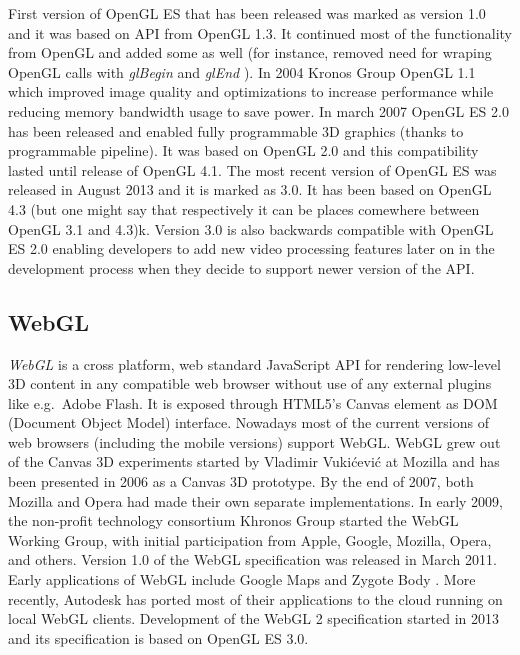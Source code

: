 First version of OpenGL ES that has been released was marked as version 1.0 and it was based on API from OpenGL 1.3.
It continued most of the functionality from OpenGL and added some as well (for instance, removed need for wraping OpenGL calls with \emph{glBegin} and \emph{glEnd} ).
\newline In 2004 Kronos Group OpenGL 1.1 which improved image quality and optimizations to increase performance while reducing memory bandwidth usage to save power.
\newline In march 2007 OpenGL ES 2.0 has been released and enabled fully programmable 3D graphics (thanks to programmable pipeline).
It was based on OpenGL 2.0 and this compatibility lasted until release of OpenGL 4.1.
\newline The most recent version of OpenGL ES was released in August 2013 and it is marked as 3.0\cite{opengl_es3_spec}.
It has been based on OpenGL 4.3 (but one might say that respectively it can be places comewhere between OpenGL 3.1 and 4.3)k.
Version 3.0 is also backwards compatible with OpenGL ES 2.0 enabling developers to add new video processing features later on in the development process when they decide to support newer version of the API.

\subsection{WebGL}
\emph{WebGL} \cite{webgl_kronos} is a cross platform, web standard JavaScript API for rendering low-level 3D content in any compatible web browser without use of any external plugins like e.g.\ Adobe Flash.
It is exposed through HTML5's Canvas element as DOM (Document Object Model) interface.
Nowadays most of the current versions of web browsers (including the mobile versions) support WebGL.
WebGL grew out of the Canvas 3D experiments started by Vladimir Vukićević at Mozilla and has been presented in 2006 as a Canvas 3D prototype.
By the end of 2007, both Mozilla and Opera had made their own separate implementations.
In early 2009, the non-profit technology consortium Khronos Group started the WebGL Working Group, with initial participation from Apple, Google, Mozilla, Opera, and others.
Version 1.0 of the WebGL specification was released in March 2011.
Early applications of WebGL include Google Maps and Zygote Body \cite{zygote_body}.
More recently, Autodesk has ported most of their applications to the cloud running on local WebGL clients.
Development of the WebGL 2 specification started in 2013 and its specification is based on OpenGL ES 3.0.

